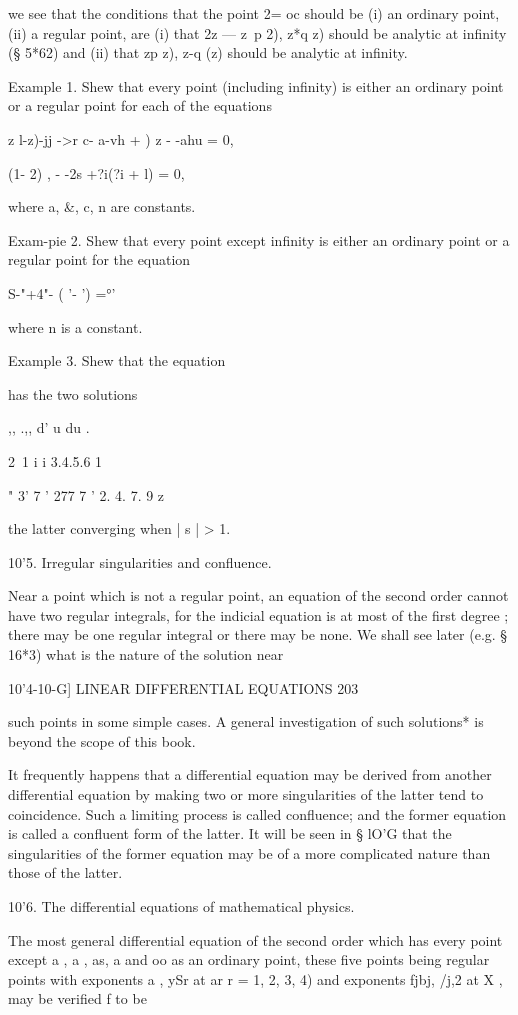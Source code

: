 we see that the conditions that the point 2= oc should be (i) an
ordinary point, (ii) a regular point, are (i) that 2z — z~p 2), z*q z)
should be analytic at infinity (§ 5*62) and (ii) that zp z), z-q (z)
should be analytic at infinity.

Example 1. Shew that every point (including infinity) is either an
ordinary point or a regular point for each of the equations

z l-z)-jj ->r c- a-vh + ) z - -ahu = 0,

(1- 2) , - -2s +?i(?i + l) = 0,

where a, \&, c, n are constants.

Exam-pie 2. Shew that every point except infinity is either an
ordinary point or a regular point for the equation

 S-"+4"- ( '- ') =°'

where n is a constant.

Example 3. Shew that the equation

has the two solutions

,, .,, d' u du .

2\ 1 i i 3.4.5.6 1

 " 3' 7 ' 277 7 ' 2. 4. 7. 9 z

the latter converging when | s | > 1.

10'5. Irregular singularities and confluence.

Near a point which is not a regular point, an equation of the second
order cannot have two regular integrals, for the indicial equation is
at most of the first degree ; there may be one regular integral or
there may be none. We shall see later (e.g. § 16*3) what is the nature
of the solution near

10'4-10-G] LINEAR DIFFERENTIAL EQUATIONS 203

such points in some simple cases. A general investigation of such
solutions* is beyond the scope of this book.

It frequently happens that a differential equation may be derived from
another differential equation by making two or more singularities of
the latter tend to coincidence. Such a limiting process is called
confluence; and the former equation is called a confluent form of the
latter. It will be seen in § lO'G that the singularities of the former
equation may be of a more complicated nature than those of the latter.

10'6. The differential equations of mathematical physics.

The most general differential equation of the second order which has
every point except a , a , as, a and oo as an ordinary point, these
five points being regular points with exponents a , ySr at ar r = 1,
2, 3, 4) and exponents fjbj, /j,2 at X , may be verified f to be

